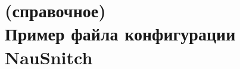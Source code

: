 \chapter[(справочное) Пример файла конфигурации NauSnitch]{(справочное)\\Пример файла конфигурации NauSnitch}
\label{ch:пример-файла-конфигурации-nausnitch}

